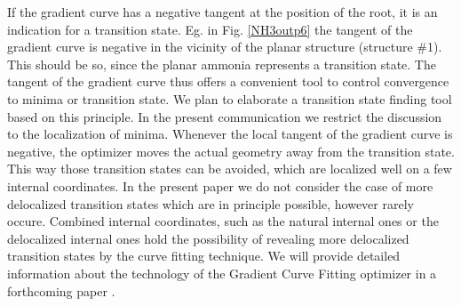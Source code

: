 \documentclass[prl,aps,twocolumn,showpacs,twocolumngrid,superbib]{revtex4}
\begin{document}
If the gradient curve has a negative tangent at the position
of the root, it is an indication for a transition state. 
Eg. in Fig. \ref{NH3outp6}
the tangent of the gradient curve is negative 
in the vicinity of the planar
structure (structure \#1). This should be so, since the planar
ammonia represents a transition state. The tangent of the gradient 
curve thus offers a
convenient tool to control convergence to minima or transition state.
We plan to elaborate a transition state finding tool based on this 
principle. In the present communication we restrict the discussion
to the localization of minima. Whenever the local tangent  
of the gradient curve
is negative, the optimizer moves the actual geometry away from 
the transition state. This way those transition states 
can be avoided, which are localized well on a few internal coordinates. 
In the present paper we do not consider the case of more 
delocalized transition states which are in principle possible,
however rarely occure. Combined internal coordinates, such
as the natural internal ones \cite{Pulay_natural_internals} or the
delocalized internal ones \cite{Baker_deloc_1} hold the possibility
of revealing more delocalized transition states by the
curve fitting technique.
%
%
We will provide detailed information about the technology of 
the Gradient Curve Fitting
optimizer in a forthcoming paper \cite{bisect-paper}.
\end{document}

